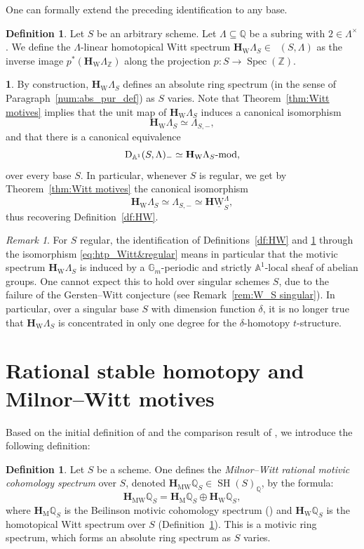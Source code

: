 \documentclass[JEP,XML,SOM,Unicode]{cedram}
\newcommand{\tstructure}{$t$-structure\xspace}
\newcommand{\modl}[1]{#1\textnormal{-}\mathrm{mod}}
\renewcommand{\AA}{\mathbb A}
\newcommand{\HuW}{\mathbf H \underline{\mathrm W}}
\newcommand{\HM}{\mathbf H_{\mathrm{M}}}
\newcommand{\HMW}{\mathbf H_{\mathrm{MW}}}
\newcommand{\HW}{\mathbf H_{\mathrm{W}}}
\DeclareMathOperator{\SH}{SH}
\DeclareMathOperator{\DA}{D_{\AA^1}}
\DeclareMathOperator{\spec}{Spec}
\newcommand{\ZZ} {\mathbb Z}
\newcommand{\QQ} {\mathbb Q}
\newcommand{\GG} {\mathbb{G}_m}
\theoremstyle{remark}
\newtheorem{rem}[thm]{Remark}
\theoremstyle{definition}
\newtheorem{df}[thm]{Definition}
\newtheorem{num}[thm]{}
\numberwithin{equation}{thm}
\begin{document}
One can formally extend the preceding identification to any base.

\begin{df}\label{df:htp_Witt_singular}
Let $S$ be an arbitrary scheme.
Let $\Lambda \subseteq \QQ$ be a subring with $2 \in \Lambda^\times$.
We define the $\Lambda$-linear homotopical Witt spectrum $\HW \Lambda_S \in \DA(S,\Lambda)$ as the inverse image $p^*(\HW \Lambda_\ZZ)$ along the projection $p:S \to \spec(\ZZ)$.
\end{df}

\begin{num}\label{num:homotopical_Witt}
By construction, $\HW \Lambda_S$ defines an absolute ring spectrum (in the sense of Paragraph~\ref{num:abs_pur_def}) as $S$ varies.
Note that Theorem~\ref{thm:Witt motives} implies that the unit map of $\HW \Lambda_S$ induces a canonical isomorphism
\[
\HW \Lambda_S \simeq \Lambda_{S,-},
\]
and that there is a canonical equivalence
\[\DA(S,\Lambda)_- \simeq \modl{\HW \Lambda_S},\]
over every base $S$.
In particular, whenever $S$ is regular, we get by Theorem~\ref{thm:Witt motives} the canonical isomorphism
\begin{equation}\label{eq:htp_Witt&regular}
\HW \Lambda_S \simeq \Lambda_{S,-} \simeq \HuW^\Lambda_S,
\end{equation}
thus recovering Definition~\ref{df:HW}.
\end{num}

\begin{rem}\label{rem:htp_Witt_singular}
For $S$ regular, the identification of Definitions~\ref{df:HW} and \ref{df:htp_Witt_singular} through the isomorphism \eqref{eq:htp_Witt&regular} means in particular that the motivic spectrum $\HW \Lambda_S$ is induced by
a $\GG$-periodic and strictly $\AA^1$-local sheaf of abelian groups.
One cannot expect this to hold over singular schemes $S$, due to the failure of the Gersten--Witt conjecture (see Remark~\ref{rem:W_S singular}). In particular, over a singular base $S$ with dimension function $\delta$, it is no longer true that $\HW \Lambda_S$ is concentrated in only one degree for the $\delta$-homotopy \tstructure.
\end{rem}

\section{Rational stable homotopy and Milnor--Witt motives}
\label{sec:MW}

Based on the initial definition of \cite[Chap.\,3 \& 6]{BCDFO} and the comparison result
of \cite[4.2]{Garkusha}, we introduce the following definition:
\begin{df}\label{df:HMWQ}
Let $S$ be a scheme. One defines the
\emph{Milnor--Witt rational motivic cohomology spectrum} over $S$, denoted $\HMW \QQ_S \in \SH(S)_\QQ$, by the formula:
\[
\HMW \QQ_S=\HM \QQ_S \oplus \HW \QQ_S,
\]
where $\HM \QQ_S$ is the Beilinson motivic cohomology spectrum (\cf \cite[14.1.2]{CD3})
and $\HW \QQ_S$ is the homotopical Witt spectrum over $S$
(Definition~\ref{df:htp_Witt_singular}).
This is a motivic ring spectrum, which forms an absolute ring spectrum as $S$ varies.
\end{df}
\end{document}
